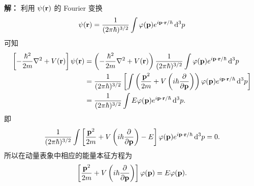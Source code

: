 \documentclass[12pt,a4paper]{article}
\begin{document}
\noindent\textbf{解：}
利用 $\psi(\vb{r})$ 的 Fourier 变换
\[
\psi(\vb{r})=\frac{1}{(2\pi\hbar)^{3/2}}\int \varphi(\vb{p})e^{i\vb{p}\cdot \vb{r}/\hbar}\, \dd^3 p
\]
可知
\begin{align*}
  \left[-\frac{\hbar^2}{2m}\nabla^2 + V(\vb{r})\right]\psi(\vb{r})
  &= \left(-\frac{\hbar^2}{2m}\nabla^2 + V(\vb{r})\right)
  \frac{1}{(2\pi\hbar)^{3/2}}\int \varphi(\vb{p})e^{i\vb{p}\cdot\vb{r}/\hbar}\, \dd^3p \\
  &= \frac{1}{(2\pi\hbar)^{3/2}}\left[\int \left(\frac{\vb{p}^2}{2m} + V\left(i\hbar\pdv{}{\vb{p}}\right)\right)
  \varphi(\vb{p})e^{i\vb{p}\cdot\vb{r}/\hbar}\, \dd^3p\right]\\
  &= \frac{1}{(2\pi\hbar)^{3/2}}\int E\varphi(\vb{p})e^{i\vb{p}\cdot\vb{r}/\hbar}\, \dd^3p.
\end{align*}
即
\[
\frac{1}{(2\pi\hbar)^{3/2}}
\int \left[\frac{\vb{p}^2}{2m}+V\left(i\hbar\pdv{}{\vb{p}}\right)-E\right]
\varphi(\vb{p})e^{i\vb{p}\cdot\vb{r}/\hbar}\, \dd^3p = 0.
\]
所以在动量表象中相应的能量本征方程为
\[
\left[\frac{\vb{p}^2}{2m}+V\left(i\hbar\pdv{}{\vb{p}}\right)\right]\varphi(\vb{p})=E\varphi(\vb{p}).
\]


\end{document}
